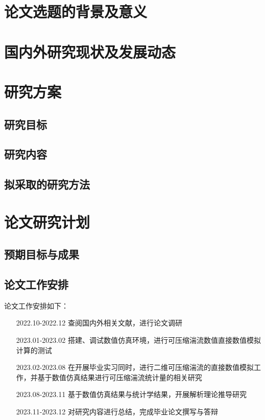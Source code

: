 \documentclass[beginterm]{../package/ecpknproposal}
\begin{document}
\maketitle

\linespread{1.5}
\pagestyle{frontmatter}
\maketoc %

\section{论文选题的背景及意义}
\section{国内外研究现状及发展动态}

\section{研究方案}
\subsection{研究目标}
\subsection{研究内容}
\subsection{拟采取的研究方法}

\section{论文研究计划}
\subsection{预期目标与成果}
\subsection{论文工作安排}
论文工作安排如下：\begin{itemize}[leftmargin=9em]
    \item[2022.10-2022.12] 查阅国内外相关文献，进行论文调研
    \item[2023.01-2023.02] 搭建、调试数值仿真环境，进行可压缩湍流数值直接数值模拟计算的测试
    \item[2023.02-2023.08]  在开展毕业实习同时，进行二维可压缩湍流的直接数值模拟工作，并基于数值仿真结果进行可压缩湍流统计量的相关研究
    \item[2023.08-2023.11]  基于数值仿真结果与统计学结果，开展解析理论推导研究
    \item[2023.11-2023.12] 对研究内容进行总结，完成毕业论文撰写与答辩
\end{itemize}


\newpage

{}
\small


\nocite{*}
\end{document}
